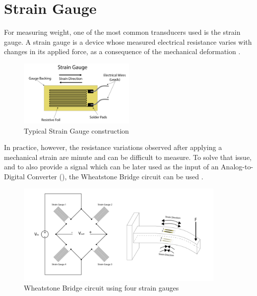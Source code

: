 \documentclass[openright]{normas-utf-tex} %
\begin{document}
\section{Strain Gauge}

For measuring weight, one of the most common transducers used is the strain
gauge. A strain gauge is a device whose measured electrical
resistance varies with changes in its applied force, as a consequence of the
mechanical deformation \cite{Stefanescu}.

\begin{figure}[H]
	\centering
	\includegraphics[width=0.5\textwidth]{./images/straingauge.png}
	\caption[Typical Strain Gauge construction]{Typical Strain Gauge construction}
	\label{fig:gauge1}
\end{figure}

In practice, however, the resistance variations observed after applying a
mechanical strain are minute and can be difficult to measure. To solve that issue,
and to also provide a signal which can be later used as the input of an
Analog-to-Digital Converter (), the Wheatstone
Bridge circuit can be used \cite{Michigan2020}.

\begin{figure}[H]
	\centering
	\includegraphics[width=0.9\textwidth]{./images/straingauge2.png}
	\caption[Wheatstone Bridge circuit using four strain gauges]{Wheatstone Bridge circuit using four strain gauges}
	\label{fig:gauge2}
\end{figure}
\end{document}
